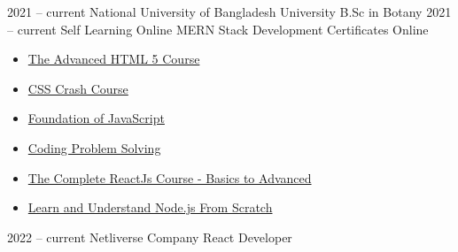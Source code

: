 \documentclass[9pt]{developercv} %
\begin{document}
\vspace{-10 pt}
\begin{entrylist}
    \entry
        {2021 -- current}
		{National University of Bangladesh}
		{University}
		{B.Sc in Botany}
    \entry
        {2021 -- current}
		{Self Learning}
		{Online}
		{MERN Stack Development}
	\entry 
         {}
		{Certificates}
		{Online}
  {\vspace{-10pt}
        \begin{itemize}[noitemsep,topsep=0pt,parsep=0pt,partopsep=0pt, leftmargin=-1pt]
            \item \href{https://ude.my/UC-17764204-0d20-48fc-a46a-bbba47b4e10a}{The Advanced HTML 5 Course}
            \item \href{https://ude.my/UC-03bcb081-37b0-4c87-b6ae-82da4df7f7e4}{CSS Crash Course}
            \item \href{https://drive.google.com/file/d/1MFcHnKhldKNf6xX_na6Q9pwkalTVlwre/view?usp=drivesdk}{Foundation of JavaScript}
            \item \href{https://drive.google.com/file/d/1M6jaFO06xIweORPI9UW7wM7kpJ8IixlH/view?usp=drivesdk}{Coding Problem Solving}
            \item \href{https://ude.my/UC-4b22e9f6-13d0-4290-bbff-7f47bc2896ca}{The Complete ReactJs Course - Basics to Advanced}
           \item \href{https://ude.my/UC-89532c78-1057-4eb8-b166-fa3118b93bd6}{Learn and Understand Node.js From Scratch}
       \end{itemize}}
\end{entrylist}

\vspace{-10 pt}
\begin{entrylist}
	\entry
        {2022 --  current}
		{Netliverse}
		{Company}
		{React Developer}
\end{entrylist}
\end{document}
